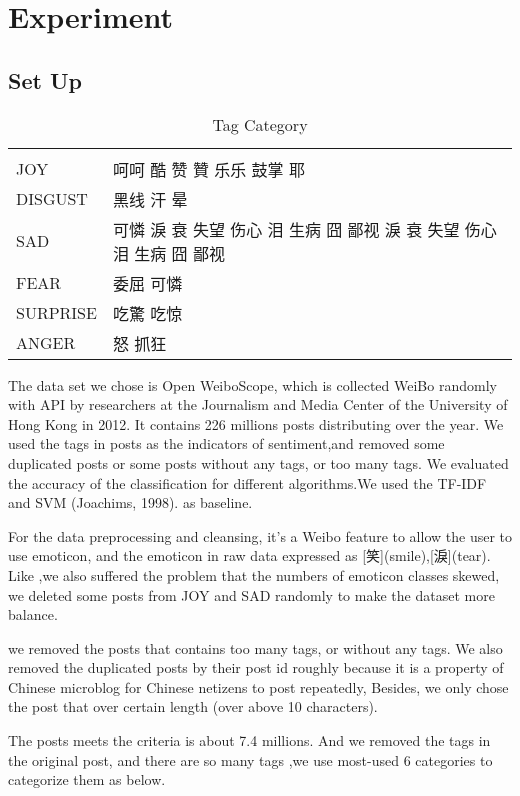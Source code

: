 \chapter{Experiment}

\section{Set Up}
\begin{table}[]
\centering
\caption{Tag Category}
\label{CategoryTable}
\begin{tabular}{ll}
      &  \\
JOY  & 呵呵 酷 赞 贊 乐乐 鼓掌 耶 \\
DISGUST & 黑线 汗 晕 \\
SAD &   可憐 淚 衰 失望 伤心 泪 生病 囧 鄙视  淚 衰 失望 伤心 泪 生病 囧 鄙视  \\
FEAR &  委屈  可憐 \\
SURPRISE &  吃驚 吃惊 \\
ANGER & 怒 抓狂
\end{tabular}
\end{table}

The data set we chose is Open WeiboScope\cite{fu2013reality}, which is collected WeiBo randomly with API by researchers at the Journalism and Media Center of the University of Hong Kong in 2012. 
It contains 226 millions posts distributing over the year. We used the tags in posts as the indicators of sentiment,and removed some duplicated posts or some posts without any tags, or too many tags. 
We evaluated the accuracy of the classification for different algorithms.We used the TF-IDF and SVM (Joachims, 1998). as baseline.

For the data preprocessing and cleansing, it's a Weibo feature to allow the user to use emoticon, 
and the emoticon in raw data expressed as [笑](smile),[淚](tear). Like \cite{zhao2012moodlens},we also suffered the problem that the numbers of emoticon classes skewed,
 we deleted some posts from JOY and SAD randomly to make the dataset more balance.  

we removed the posts that contains too many tags, or without any tags. We also removed the duplicated posts by their post id roughly because it is a property of Chinese microblog \cite{fu2013reality} for Chinese netizens to post repeatedly, 
Besides, we only chose the post that over certain length (over above 10 characters).

The posts meets the criteria is about 7.4 millions. And we removed the tags in the original post, and there are so many tags 
,we use most-used 6 categories to categorize them as below.

